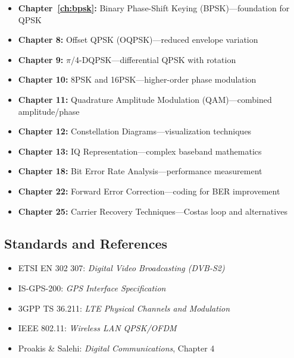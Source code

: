 \begin{itemize}
\item \textbf{Chapter~\ref{ch:bpsk}:} Binary Phase-Shift Keying (BPSK)---foundation for QPSK
\item \textbf{Chapter 8:} Offset QPSK (OQPSK)---reduced envelope variation
\item \textbf{Chapter 9:} $\pi$/4-DQPSK---differential QPSK with rotation
\item \textbf{Chapter 10:} 8PSK and 16PSK---higher-order phase modulation
\item \textbf{Chapter 11:} Quadrature Amplitude Modulation (QAM)---combined amplitude/phase
\item \textbf{Chapter 12:} Constellation Diagrams---visualization techniques
\item \textbf{Chapter 13:} IQ Representation---complex baseband mathematics
\item \textbf{Chapter 18:} Bit Error Rate Analysis---performance measurement
\item \textbf{Chapter 22:} Forward Error Correction---coding for BER improvement
\item \textbf{Chapter 25:} Carrier Recovery Techniques---Costas loop and alternatives
\end{itemize}

\subsection*{Standards and References}

\begin{itemize}
\item ETSI EN 302 307: \textit{Digital Video Broadcasting (DVB-S2)}
\item IS-GPS-200: \textit{GPS Interface Specification}
\item 3GPP TS 36.211: \textit{LTE Physical Channels and Modulation}
\item IEEE 802.11: \textit{Wireless LAN QPSK/OFDM}
\item Proakis \& Salehi: \textit{Digital Communications}, Chapter 4
\end{itemize}
